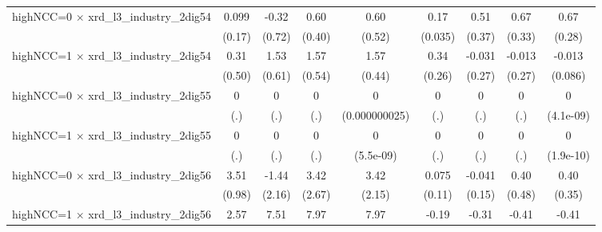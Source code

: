 {\begin{tabular}{l*{8}{c}}
\addlinespace
highNCC=0 $\times$ xrd\_l3\_industry\_2dig54&       0.099         &       -0.32         &        0.60         &        0.60         &        0.17\sym{***}&        0.51         &        0.67\sym{**} &        0.67\sym{**} \\
                    &      (0.17)         &      (0.72)         &      (0.40)         &      (0.52)         &     (0.035)         &      (0.37)         &      (0.33)         &      (0.28)         \\
\addlinespace
highNCC=1 $\times$ xrd\_l3\_industry\_2dig54&        0.31         &        1.53\sym{**} &        1.57\sym{***}&        1.57\sym{***}&        0.34         &      -0.031         &      -0.013         &      -0.013         \\
                    &      (0.50)         &      (0.61)         &      (0.54)         &      (0.44)         &      (0.26)         &      (0.27)         &      (0.27)         &     (0.086)         \\
\addlinespace
highNCC=0 $\times$ xrd\_l3\_industry\_2dig55&           0         &           0         &           0         &           0         &           0         &           0         &           0         &           0         \\
                    &         (.)         &         (.)         &         (.)         &(0.000000025)         &         (.)         &         (.)         &         (.)         &   (4.1e-09)         \\
\addlinespace
highNCC=1 $\times$ xrd\_l3\_industry\_2dig55&           0         &           0         &           0         &           0         &           0         &           0         &           0         &           0         \\
                    &         (.)         &         (.)         &         (.)         &   (5.5e-09)         &         (.)         &         (.)         &         (.)         &   (1.9e-10)         \\
\addlinespace
highNCC=0 $\times$ xrd\_l3\_industry\_2dig56&        3.51\sym{***}&       -1.44         &        3.42         &        3.42         &       0.075         &      -0.041         &        0.40         &        0.40         \\
                    &      (0.98)         &      (2.16)         &      (2.67)         &      (2.15)         &      (0.11)         &      (0.15)         &      (0.48)         &      (0.35)         \\
\addlinespace
highNCC=1 $\times$ xrd\_l3\_industry\_2dig56&        2.57\sym{***}&        7.51\sym{***}&        7.97\sym{***}&        7.97\sym{***}&       -0.19\sym{**} &       -0.31\sym{**} &       -0.41\sym{**} &       -0.41\sym{***}\\

\end{tabular}}
